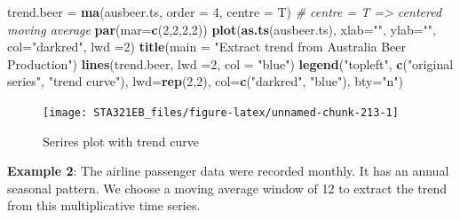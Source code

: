 \documentclass[
]{book}
\newenvironment{Shaded}{\begin{snugshade}}{\end{snugshade}}
\newcommand{\AttributeTok}[1]{\textcolor[rgb]{0.13,0.29,0.53}{#1}}
\newcommand{\CommentTok}[1]{\textcolor[rgb]{0.56,0.35,0.01}{\textit{#1}}}
\newcommand{\DecValTok}[1]{\textcolor[rgb]{0.00,0.00,0.81}{#1}}
\newcommand{\FunctionTok}[1]{\textcolor[rgb]{0.13,0.29,0.53}{\textbf{#1}}}
\newcommand{\NormalTok}[1]{#1}
\newcommand{\OtherTok}[1]{\textcolor[rgb]{0.56,0.35,0.01}{#1}}
\newcommand{\StringTok}[1]{\textcolor[rgb]{0.31,0.60,0.02}{#1}}
\begin{document}
\begin{Shaded}
\begin{Highlighting}[]
\NormalTok{trend.beer }\OtherTok{=} \FunctionTok{ma}\NormalTok{(ausbeer.ts, }\AttributeTok{order =} \DecValTok{4}\NormalTok{, }\AttributeTok{centre =}\NormalTok{ T)  }\CommentTok{\# centre = T =\textgreater{} centered moving average}
\FunctionTok{par}\NormalTok{(}\AttributeTok{mar=}\FunctionTok{c}\NormalTok{(}\DecValTok{2}\NormalTok{,}\DecValTok{2}\NormalTok{,}\DecValTok{2}\NormalTok{,}\DecValTok{2}\NormalTok{))}
\FunctionTok{plot}\NormalTok{(}\FunctionTok{as.ts}\NormalTok{(ausbeer.ts), }\AttributeTok{xlab=}\StringTok{""}\NormalTok{, }\AttributeTok{ylab=}\StringTok{""}\NormalTok{, }\AttributeTok{col=}\StringTok{"darkred"}\NormalTok{, }\AttributeTok{lwd =}\DecValTok{2}\NormalTok{)}
\FunctionTok{title}\NormalTok{(}\AttributeTok{main =} \StringTok{"Extract trend from Australia Beer Production"}\NormalTok{)}
\FunctionTok{lines}\NormalTok{(trend.beer, }\AttributeTok{lwd =}\DecValTok{2}\NormalTok{, }\AttributeTok{col =} \StringTok{"blue"}\NormalTok{)}
\FunctionTok{legend}\NormalTok{(}\StringTok{"topleft"}\NormalTok{, }\FunctionTok{c}\NormalTok{(}\StringTok{"original series"}\NormalTok{, }\StringTok{"trend curve"}\NormalTok{), }\AttributeTok{lwd=}\FunctionTok{rep}\NormalTok{(}\DecValTok{2}\NormalTok{,}\DecValTok{2}\NormalTok{),}
       \AttributeTok{col=}\FunctionTok{c}\NormalTok{(}\StringTok{"darkred"}\NormalTok{, }\StringTok{"blue"}\NormalTok{), }\AttributeTok{bty=}\StringTok{"n"}\NormalTok{)}
\end{Highlighting}
\end{Shaded}

\begin{figure}

{\centering \texttt{[image: STA321EB\_files/figure-latex/unnamed-chunk-213-1]} 

}

\caption{Serires plot with trend curve}\label{fig:unnamed-chunk-213}
\end{figure}

\textbf{Example 2}: The airline passenger data were recorded monthly. It has an annual seasonal pattern. We choose a moving average window of 12 to extract the trend from this multiplicative time series.
\end{document}
